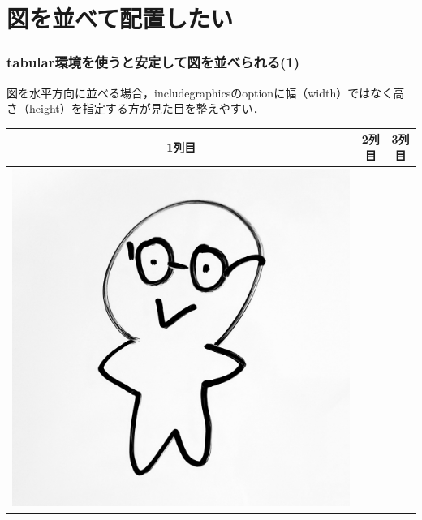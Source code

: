 \documentclass[unicode, 9pt, aspectratio=169]{beamer}
\begin{document}
\section{図を並べて配置したい}
\begin{frame}
\frametitle{tabular環境を使うと安定して図を並べられる(1)}
図を水平方向に並べる場合，includegraphicsのoptionに幅（width）ではなく高さ（height）を指定する方が見た目を整えやすい．

\begin{center}
    \begin{minipage}{.7\linewidth}
        \begin{block}{}
            \centering
            \begin{tabular}{ccc}
                1列目 & 2列目 & 3列目 \\ \midrule
                \includegraphics[height=.3\textheight]{figs/fig.jpg}
                &

\end{tabular}
\end{block}
\end{minipage}
\end{center}
\end{frame}
\end{document}
